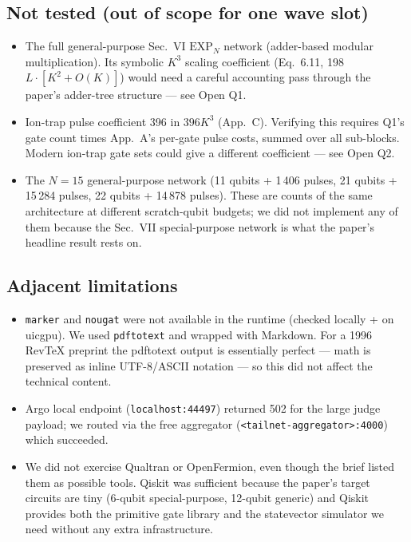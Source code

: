 \documentclass[11pt]{article}
\begin{document}
\subsection*{Not tested (out of scope for one wave slot)}
\begin{itemize}
  \item The full general-purpose Sec.~VI $\mathrm{EXP}_N$ network (adder-based
        modular multiplication).  Its symbolic $K^{3}$ scaling coefficient
        (Eq.~6.11, 198$L\cdot[K^{2} + O(K)]$) would need a careful accounting
        pass through the paper's adder-tree structure --- see Open Q1.
  \item Ion-trap pulse coefficient 396 in $396K^{3}$ (App.~C).  Verifying
        this requires Q1's gate count times App.~A's per-gate pulse costs,
        summed over all sub-blocks.  Modern ion-trap gate sets could give
        a different coefficient --- see Open Q2.
  \item The $N=15$ general-purpose network (11 qubits + 1\,406 pulses,
        21 qubits + 15\,284 pulses, 22 qubits + 14\,878 pulses).  These are
        counts of the same architecture at different scratch-qubit budgets;
        we did not implement any of them because the Sec.~VII special-purpose
        network is what the paper's headline result rests on.
\end{itemize}

\subsection*{Adjacent limitations}
\begin{itemize}
  \item \texttt{marker} and \texttt{nougat} were not available in the runtime
        (checked locally + on uicgpu).  We used \texttt{pdftotext} and wrapped
        with Markdown.  For a 1996 RevTeX preprint the pdftotext output is
        essentially perfect --- math is preserved as inline
        UTF-8/ASCII notation --- so this did not affect the technical
        content.
  \item Argo local endpoint (\texttt{localhost:44497}) returned 502 for the
        large judge payload; we routed via the free aggregator
        (\texttt{<tailnet-aggregator>:4000}) which succeeded.
  \item We did not exercise Qualtran or OpenFermion, even though the brief
        listed them as possible tools.  Qiskit was sufficient because the
        paper's target circuits are tiny (6-qubit special-purpose, 12-qubit
        generic) and Qiskit provides both the primitive gate library and
        the statevector simulator we need without any extra infrastructure.
\end{itemize}
\end{document}
